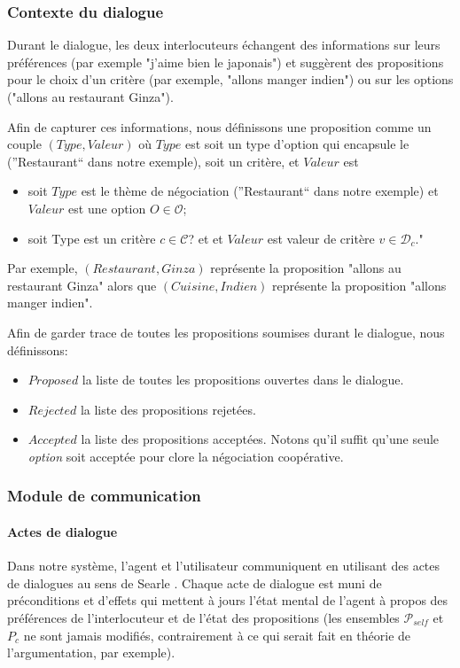\documentclass [french]{sig-alternate-05-2015}
\begin{document}
\subsubsection{Contexte du dialogue}
\par Durant le dialogue, les deux interlocuteurs échangent des informations sur leurs préférences (par exemple "j'aime bien le japonais") et suggèrent des propositions pour le choix d'un critère (par exemple, "allons manger indien") ou sur les options ("allons au restaurant Ginza").

Afin de capturer ces informations, nous définissons une proposition comme un couple $(Type, Valeur)$ où $Type$ est soit un type d'option qui encapsule le (''Restaurant`` dans notre exemple), soit un critère, et $Valeur$ est
\begin{itemize}
	\item 	soit $Type$  est le thème de négociation (”Restaurant“ dans notre exemple)
	et $Valeur$ est une option $O \in \mathcal{O}$;
	\item soit Type est un critère  $c \in \mathcal{C}$?  et et $Valeur$ est valeur de critère $v \in \mathcal{D}_c$."
\end{itemize}
Par exemple, $(Restaurant,Ginza)$ représente la proposition "allons au restaurant Ginza" alors que $(Cuisine,Indien)$ représente la proposition "allons manger indien".

Afin de garder trace de toutes les propositions soumises durant le dialogue, nous définissons:
\begin{itemize}
	\item $ Proposed$ la liste de toutes les propositions ouvertes dans le dialogue.
	\item $ Rejected$ la liste des propositions rejetées.
	\item $ Accepted$ la liste des propositions acceptées. Notons qu'il suffit qu'une seule \emph{option} soit acceptée pour clore la négociation coopérative.
\end{itemize}

\subsubsection{Module de communication}

\paragraph{Actes de dialogue}
\par Dans notre système, l'agent et l'utilisateur communiquent en utilisant des actes de dialogues au sens de Searle \cite{searle1969speech}. Chaque acte de dialogue est muni de préconditions et d'effets qui mettent à jours l'état mental de l'agent à propos des préférences de l'interlocuteur et de l'état des propositions (les ensembles $\mathcal{P}_{self}$ et $P_c$ ne sont jamais modifiés, contrairement à ce qui serait fait en théorie de l'argumentation, par exemple). 
\end{document}
